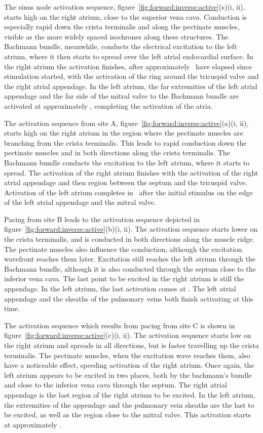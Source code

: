 The sinus node activation sequence,
figure~\ref{fig:forward:inverse:active}(s)(i, ii), starts high on the right
atrium, close to the superior vena cava.
Conduction is especially rapid down the crista terminalis and along the
pectinate muscles, visible as the more widely spaced isochrones along these
structures.
The Bachmann bundle, meanwhile, conducts the electrical excitation to the left
atrium, where it then starts to spread over the left atrial endocardial surface.
In the right atrium the activation finishes, after approximately \ have
elapsed since stimulation started, with the activation of the ring around the
tricuspid valve and the right atrial appendage.
In the left atrium, the far extremities of the left atrial appendage and the far
side of the mitral valve to the Bachmann bundle are activated at approximately
, completing the activation of the atria.

The activation sequence from site A,
figure~\ref{fig:forward:inverse:active}(a)(i, ii), starts high on the right
atrium in the region where the pectinate muscles are branching from the crista
terminalis.
This leads to rapid conduction down the pectinate muscles and in both directions
along the crista terminalis.
The Bachmann bundle conducts the excitation to the left atrium, where it starts
to spread.
The activation of the right atrium finishes with the activation of the right
atrial appendage and then region between the septum and the tricuspid valve.
Activation of the left atrium completes in \ after the initial stimulus
on the edge of the left atrial appendage and the mitral valve.

Pacing from site B leads to the activation sequence depicted in
figure~\ref{fig:forward:inverse:active}(b)(i, ii).
The activation sequence starts lower on the crista terminalis, and is conducted
in both directions along the muscle ridge.
The pectinate muscles also influence the conduction, although the excitation
wavefront reaches them later.
Excitation still reaches the left atrium through the Bachmann bundle, although
it is also conducted through the septum close to the inferior vena cava.
The last point to be excited in the right atrium is still the appendage.
In the left atrium, the last activation comes at .
The left atrial appendage and the sheaths of the pulmonary veins both finish
activating at this time.

The activation sequence which results from pacing from site C is shown in
figure~\ref{fig:forward:inverse:active}(c)(i, ii).
The activation sequence starts low on the right atrium and spreads in all
directions, but is faster travelling up the crista terminalis.
The pectinate muscles, when the excitation wave reaches them, also have a
noticeable effect, speeding activation of the right atrium.
Once again, the left atrium appears to be excited in two places, both by the
bachmann's bundle and close to the inferior vena cava through the septum.
The right atrial appendage is the last region of the right atrium to be excited.
In the left atrium, the extremities of the appendage and the pulmonary vein
sheaths are the last to be excited, as well as the region close to the mitral
valve.
This activation starts at approximately .

